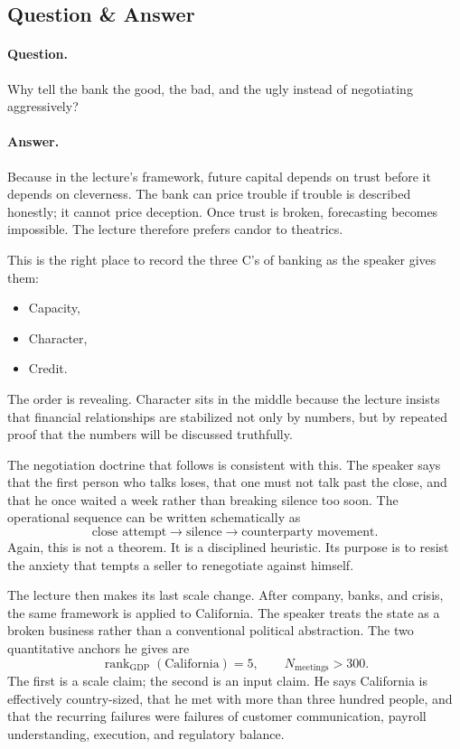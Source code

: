 \subsection{Question \& Answer}

\paragraph{Question.}
Why tell the bank the good, the bad, and the ugly instead of negotiating aggressively?

\paragraph{Answer.}
Because in the lecture's framework, future capital depends on trust before it depends on cleverness. The bank can price trouble if trouble is described honestly; it cannot price deception. Once trust is broken, forecasting becomes impossible. The lecture therefore prefers candor to theatrics.

This is the right place to record the three C's of banking as the speaker gives them:
\begin{itemize}
\item Capacity,
\item Character,
\item Credit.
\end{itemize}
The order is revealing. Character sits in the middle because the lecture insists that financial relationships are stabilized not only by numbers, but by repeated proof that the numbers will be discussed truthfully.

The negotiation doctrine that follows is consistent with this. The speaker says that the first person who talks loses, that one must not talk past the close, and that he once waited a week rather than breaking silence too soon. The operational sequence can be written schematically as
\begin{equation}
\text{close attempt} \longrightarrow \text{silence} \longrightarrow \text{counterparty movement}.
\end{equation}
Again, this is not a theorem. It is a disciplined heuristic. Its purpose is to resist the anxiety that tempts a seller to renegotiate against himself.

The lecture then makes its last scale change. After company, banks, and crisis, the same framework is applied to California. The speaker treats the state as a broken business rather than a conventional political abstraction. The two quantitative anchors he gives are
\begin{equation}
\operatorname{rank}_{\mathrm{GDP}}(\mathrm{California})=5,\qquad
N_{\mathrm{meetings}}>300.
\end{equation}
The first is a scale claim; the second is an input claim. He says California is effectively country-sized, that he met with more than three hundred people, and that the recurring failures were failures of customer communication, payroll understanding, execution, and regulatory balance.

